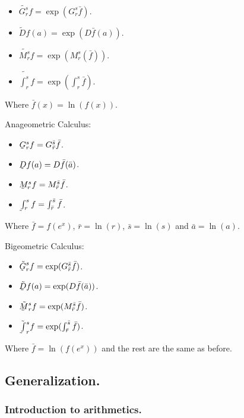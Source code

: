 \begin{itemize}
	\item $\tilde{G_r^s}f = \exp(G_r^s \bar{f})$.
	\item $\tilde{D}f(a) = \exp(D\bar{f}(a))$.
	\item $\tilde{M_r^s}f = \exp(M_r^s(\bar{f}))$.
	\item $\tilde{\int_r^s} f = \exp(\int_r^s \bar{f})$.
\end{itemize}

Where $\bar{f}(x) = \ln(f(x))$.

Anageometric Calculus:

\begin{itemize}
	\item $\underaccent{\tilde}{G}_r^s f = G_{\bar{r}}^{\bar{s}} \bar{f}$.
	\item $\underaccent{\tilde}{D}f(a) = D\bar{f}(\bar{a})$.
	\item $\underaccent{\tilde}{M}_r^sf = M_{\bar{r}}^{\bar{s}} \bar{f}$.
	\item $\underaccent{\tilde}{\int}_r^s f = \int_{\bar{r}}^{\bar{s}} \bar{f}$.
\end{itemize}

Where $\bar{f} = f(e^x)$, $\bar{r} = \ln(r)$, $\bar{s} = \ln(s)$ and $\bar{a} = \ln(a)$.

Bigeometric Calculus:

\begin{itemize}
	\item $\tilde{\underaccent{\tilde}{G}}_r^s f = \exp(G_{\bar{r}}^{\bar{s}} \bar{f})$.
	\item $\tilde{\underaccent{\tilde}{D}}f(a) = \exp(D\bar{f}(\bar{a}))$.
	\item $\tilde{\underaccent{\tilde}{M}}_r^s f = \exp(M_{\bar{r}}^{\bar{s}} \bar{f})$.
	\item $\tilde{\underaccent{\tilde}{\int}}_r^s f = \exp(\int_{\bar{r}}^{\bar{s}} \bar{f})$.
\end{itemize}

Where $\bar{f} = \ln(f(e^x))$ and the rest are the same as before.

\subsection{Generalization.} \label{general}

\subsubsection{Introduction to arithmetics.}

